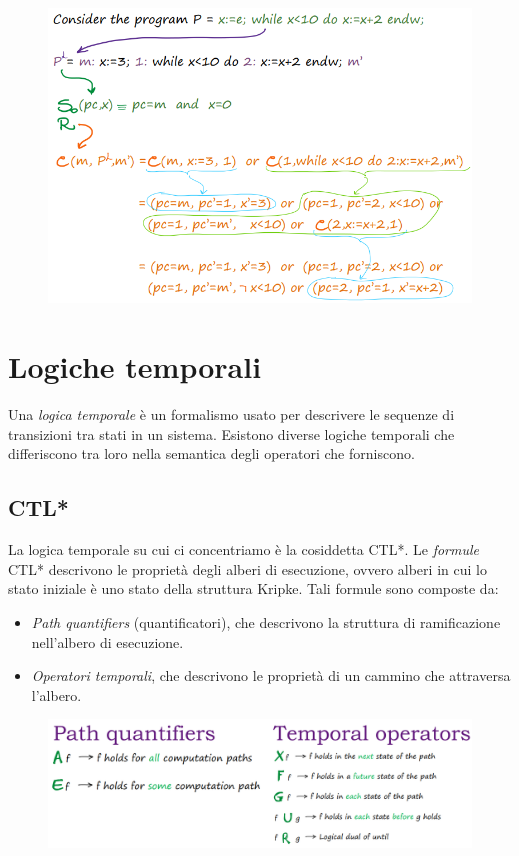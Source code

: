 \documentclass[a4paper,oneside,titlepage]{book}
\begin{document}
\begin{figure}[htp]
	\centering
	\includegraphics[width=\textwidth, height=\textheight, keepaspectratio]{kripke6.png}
\end{figure}

\section{Logiche temporali} %
Una \textit{logica temporale} è un formalismo usato per descrivere le sequenze di transizioni tra stati in un sistema. Esistono diverse logiche temporali che differiscono tra loro nella semantica degli operatori che forniscono.

\subsection{CTL*}
La logica temporale su cui ci concentriamo è la cosiddetta CTL*. Le \textit{formule} CTL* descrivono le proprietà degli alberi di esecuzione, ovvero alberi in cui lo stato iniziale è uno stato della struttura Kripke. Tali formule sono composte da:
\begin{itemize}
    \item \textit{Path quantifiers} (quantificatori), che descrivono la struttura di ramificazione nell'albero di esecuzione.
    \item \textit{Operatori temporali}, che descrivono le proprietà di un cammino che attraversa l'albero.
\end{itemize}
\begin{figure}[htp]
	\centering
	\includegraphics[width=\textwidth, height=\textheight, keepaspectratio]{ctl1.png}
\end{figure}
\end{document}
